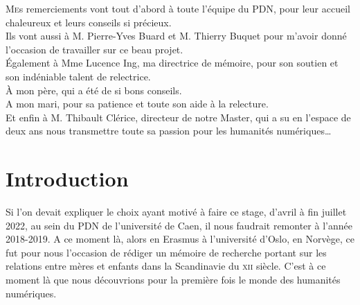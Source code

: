 \documentclass[a4paper,12pt,twoside]{book}
\begin{document}
	\lettrine{M}es remerciements vont tout d'abord à toute l'équipe du \acrshort{PDN}, pour leur accueil chaleureux et leurs conseils si précieux.\\
	
	
	Ils vont aussi à M. Pierre-Yves Buard et M. Thierry Buquet pour m'avoir donné l'occasion de travailler sur ce beau projet.\\
	
	
	Également à Mme Lucence Ing, ma directrice de mémoire, pour son soutien et son indéniable talent de relectrice.\\
	
	
	À mon père, qui a été de si bons conseils.\\
	
	
	A mon mari, pour sa patience et toute son aide à la relecture.\\
	
	
	Et enfin à M. Thibault Clérice, directeur de notre Master, qui a su en l'espace de deux ans nous transmettre toute sa passion pour les humanités numériques\dots
	
	
\printbibliography[title=Bibliographie,prenote=intro, notkeyword = eco, notkeyword = num, notkeyword = shs]


\printbibliography[heading=subbibliography,title={Références autour de la recherche en SHS},keyword=shs]
\printbibliography[heading=subbibliography,title={Références autour du numérique et du développement},keyword=num]
\printbibliography[heading=subbibliography,title={Références autour de l'écologie et de l'environnement},keyword=eco]
	
	\chapter{Introduction}
Si l'on devait expliquer le choix ayant motivé à faire ce stage, d'avril à fin juillet 2022, au sein du \acrfull{PDN} de l'université de Caen, il nous faudrait remonter à l'année 2018-2019. A ce moment là, alors en Erasmus à l'université d'Oslo, en Norvège, ce fut pour nous l'occasion de rédiger un mémoire de recherche portant sur les relations entre mères et enfants dans la Scandinavie du \textsc{xii}\ieme{} siècle. C'est à ce moment là que nous découvrions pour la première fois le monde des humanités numériques.
\end{document}
